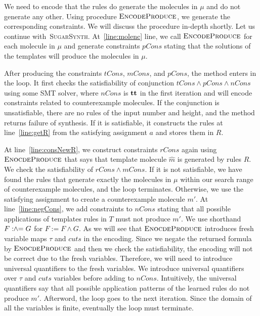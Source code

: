 We need to encode that the rules do generate the molecules
in $\mu$ and do not generate any other.
Using procedure $\textsc{EncodeProduce}$, we generate
the corresponding constraints.
We will discuss the procedure in-depth shortly.
Let us continue with~\textsc{SugarSynth}.
At~\ref{line:molenc} line, we call $\textsc{EncodeProduce}$ for
each molecule in $\mu$ and generate constraints $pCons$ stating that
the solutions of the templates will produce the molecules in $\mu$.

After producing the constraints $tCons$, $mCons$, and $pCons$,
the method enters in the loop.
It first checks the satisfiability of conjunction
$tCons \land pCons \land nCons$
using some SMT solver, where $nCons$ is $\mathbf{tt}$ in the first iteration
and will encode constraints related to counterexample molecules.
If the conjunction is unsatisfiable, there are no rules of
the input number and height,
and the method returns failure of synthesis.
If it is satisfiable, it constructs the rules at line~\ref{line:getR} from
the satisfying assignment $a$
and stores them in $R$.

At line~\ref{line:consNewR}, we construct constraints $rCons$ again using
$\textsc{EnocdeProduce}$ that says that template molecule $\hat{m}$
is generated by rules $R$.
We check the satisfiability of $rCons \land mCons$.
If it is not satisfiable, we have found the rules that generate exactly
the molecules in $\mu$ within our search range of counterexample molecules,
and the loop terminates.
Otherwise, we use the satisfying assignment to create a
counterexample molecule $m'$.
At line~\ref{line:negCons}, we add constraints to $nCons$ stating that
all possible applications of templates rules in $T$ must not produce $m'$.
We use shorthand $F \mathrel{:\hspace{-3pt}\land\hspace{-3pt}=} G$ for $ F := F \land G$.
As we will see that $\textsc{EnocdeProduce}$ introduces fresh variable
maps $\tau$ and $cuts$ in the encoding.
Since we negate the returned formula by $\textsc{EnocdeProduce}$ 
and then we check the satisfiability, the encoding will not be correct
due to the fresh variables.
Therefore, we will need to introduce universal quantifiers to the
fresh variables.
We introduce universal quantifiers over $\tau$ and $cuts$
variables before adding to $nCons$.
Intuitively, the universal quantifiers say that all possible
application patterns of the learned rules do not produce $m'$.
Afterword, the loop goes to the next iteration.
Since the domain of all the variables is finite, eventually the loop must
terminate.



